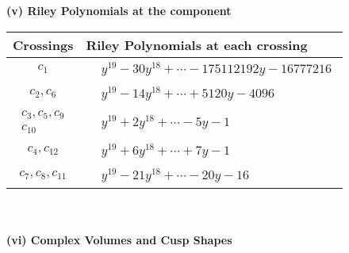 \documentclass[1p]{elsarticle_modified}
\theoremstyle{definition}
\begin{document}
\newpage\renewcommand{\arraystretch}{1}
\flushleft \textbf{(v) Riley Polynomials at the component}\newline \\
\begin{tabular}{m{50pt}|m{274pt}}
Crossings & \hspace{64pt}Riley Polynomials at each crossing \\
\hline $$\begin{aligned}c_{1}\end{aligned}$$&$\begin{aligned}
&y^{19}-30 y^{18}+\cdots-175112192 y-16777216
\end{aligned}$\\
\hline $$\begin{aligned}c_{2},c_{6}\end{aligned}$$&$\begin{aligned}
&y^{19}-14 y^{18}+\cdots+5120 y-4096
\end{aligned}$\\
\hline $$\begin{aligned}c_{3},c_{5},c_{9}\\c_{10}\end{aligned}$$&$\begin{aligned}
&y^{19}+2 y^{18}+\cdots-5 y-1
\end{aligned}$\\
\hline $$\begin{aligned}c_{4},c_{12}\end{aligned}$$&$\begin{aligned}
&y^{19}+6 y^{18}+\cdots+7 y-1
\end{aligned}$\\
\hline $$\begin{aligned}c_{7},c_{8},c_{11}\end{aligned}$$&$\begin{aligned}
&y^{19}-21 y^{18}+\cdots-20 y-16
\end{aligned}$\\
\hline
\end{tabular}\\~\\
\newpage\flushleft \textbf{(vi) Complex Volumes and Cusp Shapes}
\end{document}
